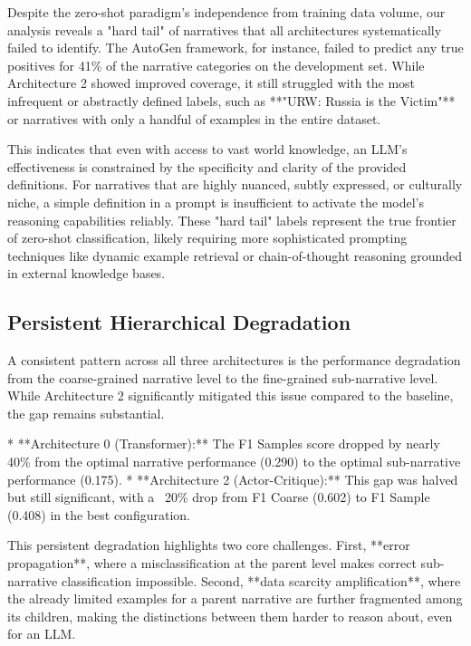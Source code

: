 Despite the zero-shot paradigm's independence from training data volume, our analysis reveals a "hard tail" of narratives that all architectures systematically failed to identify. The AutoGen framework, for instance, failed to predict any true positives for 41\% of the narrative categories on the development set. While Architecture 2 showed improved coverage, it still struggled with the most infrequent or abstractly defined labels, such as **"URW: Russia is the Victim"** or narratives with only a handful of examples in the entire dataset.

This indicates that even with access to vast world knowledge, an LLM's effectiveness is constrained by the specificity and clarity of the provided definitions. For narratives that are highly nuanced, subtly expressed, or culturally niche, a simple definition in a prompt is insufficient to activate the model's reasoning capabilities reliably. These "hard tail" labels represent the true frontier of zero-shot classification, likely requiring more sophisticated prompting techniques like dynamic example retrieval or chain-of-thought reasoning grounded in external knowledge bases.

\subsection{Persistent Hierarchical Degradation}

A consistent pattern across all three architectures is the performance degradation from the coarse-grained narrative level to the fine-grained sub-narrative level. While Architecture 2 significantly mitigated this issue compared to the baseline, the gap remains substantial.

*   **Architecture 0 (Transformer):** The F1 Samples score dropped by nearly 40\% from the optimal narrative performance (0.290) to the optimal sub-narrative performance (0.175).
*   **Architecture 2 (Actor-Critique):** This gap was halved but still significant, with a ~20\% drop from F1 Coarse (0.602) to F1 Sample (0.408) in the best configuration.

This persistent degradation highlights two core challenges. First, **error propagation**, where a misclassification at the parent level makes correct sub-narrative classification impossible. Second, **data scarcity amplification**, where the already limited examples for a parent narrative are further fragmented among its children, making the distinctions between them harder to reason about, even for an LLM.

